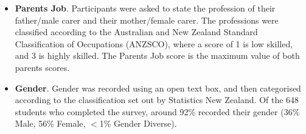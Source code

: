 \begin{itemize}
    \item \textbf{Parents Job}. Participants were asked to state the profession of their father/male carer and their mother/female carer. The professions were classified according to the Australian and New Zealand Standard Classification of Occupations (ANZSCO), where a score of 1 is low skilled, and 3 is highly skilled. The Parents Job score is the maximum value of both parents scores.
    \item \textbf{Gender}. Gender was recorded using an open text box, and then categorised according to the classification set out by Statistics New Zealand. Of the 648 students who completed the survey, around 92\% recorded their gender (36\% Male, 56\% Female, $<$1\% Gender Diverse). 

\end{itemize}
\begin{landscape}
\begin{table}
\label{tab:ItemMeansSDs}       %


\end{table}
\end{landscape}
